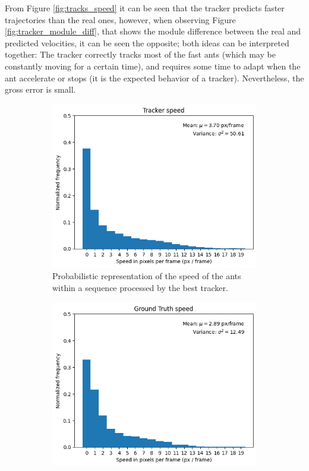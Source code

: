 
{
    From Figure \ref{fig:tracks_speed} it can be seen that the tracker predicts faster trajectories than the real ones, 
	however, when observing Figure \ref{fig:tracker_module_diff}, that shows the module difference between the real and predicted velocities, 
	it can be seen the opposite; both ideas can be interpreted together: The tracker correctly tracks most of the fast ants 
	(which may be constantly moving for a certain time), and requires some time to adapt when the ant accelerate or stops 
	(it is the expected behavior of a tracker). Nevertheless, the gross error is small.
}

\begin{figure}[!hp]
	\centering
    \begin{subfigure}[]{0.45\textwidth}
		\includegraphics[width=\textwidth]{figures/06_results/da/TrackerSpeed.png}
		\caption{\footnotesize{Probabilistic representation of the speed of the ants within a sequence processed by the best tracker.}}
		\label{fig:tracks_speed_tck}
	\end{subfigure}
	\begin{subfigure}[]{0.45\textwidth}
		\includegraphics[width=\textwidth]{figures/06_results/da/GroundTruthSpeed.png}

\end{subfigure}
\end{figure}
